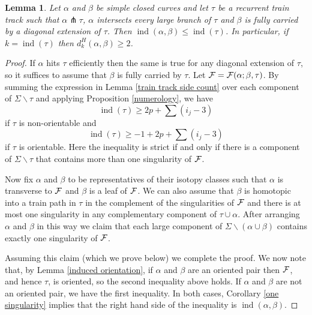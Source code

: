 \documentclass[11pt]{article}
\newtheorem{lemma}[thm]{Lemma}
\theoremstyle{remark}
\def\ind{\operatorname{ind}}
\newcommand{\cF}{{\cal F}}
\begin{document}
\begin{lemma}\label{lower bound}
Let $\alpha$ and $\beta$ be simple closed curves and let $\tau$ be a recurrent train track such that $\alpha \pitchfork \tau$, $\alpha$ intersects every large branch of $\tau$ and $\beta$ is fully carried by a diagonal extension of $\tau$.
Then $\ind(\alpha, \beta) \le \ind(\tau)$. In particular, if $k = \ind(\tau)$ then $d^H_k(\alpha, \beta) \ge 2$.
\end{lemma}

\begin{proof}
If $\alpha$ hits $\tau$ efficiently then the same is true for any diagonal extension of $\tau$, so it suffices to assume that $\beta$ is fully carried by $\tau$.  Let $\cF = \cF(\alpha; \beta, \tau)$. By summing the expression in Lemma \ref{train track side count}
over each component of $\Sigma\smallsetminus \tau$ and applying Proposition
\ref{numerology}, we have
$$\ind(\tau) \ge 2p + \sum(i_j - 3)$$
if $\tau$ is non-orientable and
$$\ind(\tau) \ge -1 +2p + \sum(i_j - 3)$$ 
if $\tau$ is orientable. Here the inequality is strict if and only if there is a component of $\Sigma\smallsetminus \tau$ that contains more than one singularity
of $\cF$.

Now fix $\alpha$ and $\beta$ to be representatives of their isotopy classes such that $\alpha$ is transverse to $\cF$ and $\beta$ is a leaf of $\cF$. We can also assume that $\beta$ is homotopic into a train path in $\tau$ in the complement of the singularities of $\cF$ and there is at most one singularity in any complementary component of $\tau\cup\alpha$. After arranging $\alpha$ and $\beta$ in this way we claim that
each large component of $\Sigma\smallsetminus(\alpha\cup\beta)$ contains exactly one singularity of $\cF$.

Assuming this claim (which we prove below) we complete the proof.
We now note that, by Lemma \ref{induced orientation}, if $\alpha$ and $\beta$ are an oriented pair then $\cF$, and hence $\tau$, is oriented, so the second inequality above holds. If $\alpha$ and $\beta$ are not an oriented pair, we have the first inequality. In both cases, Corollary \ref{one singularity} implies that the right hand side of the inequality is $\ind(\alpha, \beta)$.
\end{proof}
\end{document}
